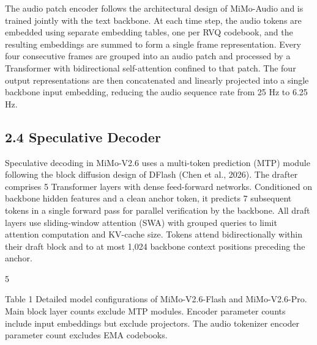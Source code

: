 \documentclass[
  10
]{article}
\begin{document}
The audio patch encoder follows the architectural design of MiMo-Audio
and is trained jointly with the text backbone. At each time step, the
audio tokens are embedded using separate embedding tables, one per RVQ
codebook, and the resulting embeddings are summed to form a single frame
representation. Every four consecutive frames are grouped into an audio
patch and processed by a Transformer with bidirectional self-attention
confined to that patch. The four output representations are then
concatenated and linearly projected into a single backbone input
embedding, reducing the audio sequence rate from 25 Hz to 6.25 Hz.

\subsection{2.4 Speculative Decoder}\label{speculative-decoder}

Speculative decoding in MiMo-V2.6 uses a multi-token prediction (MTP)
module following the block diffusion design of DFlash (Chen et al.,
2026). The drafter comprises 5 Transformer layers with dense
feed-forward networks. Conditioned on backbone hidden features and a
clean anchor token, it predicts 7 subsequent tokens in a single forward
pass for parallel verification by the backbone. All draft layers use
sliding-window attention (SWA) with grouped queries to limit attention
computation and KV-cache size. Tokens attend bidirectionally within
their draft block and to at most 1,024 backbone context positions
preceding the anchor.

5

Table 1 Detailed model configurations of MiMo-V2.6-Flash and
MiMo-V2.6-Pro. Main block layer counts exclude MTP modules. Encoder
parameter counts include input embeddings but exclude projectors. The
audio tokenizer encoder parameter count excludes EMA codebooks.
\end{document}
